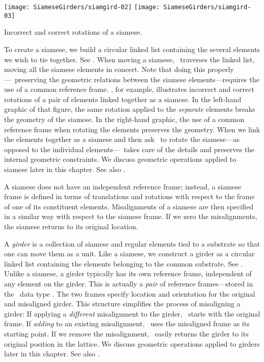 \begin{MarginFigure}
  \texttt{[image: SiameseGirders/siamgird-02]}\quad
  \texttt{[image: SiameseGirders/siamgird-03]}
  \caption{Incorrect and correct rotations of a siamese.}
  \label{fig:siamese.rot}
\end{MarginFigure}

To create a siamese, we build a circular linked list containing
the several elements we wish to tie together. See .
When moving a siamese, \PTC\ traverses the linked list, moving
all the siamese elements in concert. Note that doing this
properly---\ie\ preserving the geometric relations between the
siamese elements---requires the use of a common reference frame.
, for example, illustrates incorrect and correct rotations of a pair of elements linked together as a siamese.
In the left-hand graphic of that figure, the same rotation applied
to the \emph{separate} elements breaks the geometry of the siamese.
In the right-hand graphic, the use of a common reference frame when
rotating the elements preserves the geometry. When we link the
elements together as a siamese and then ask \PTC\ to rotate the
siamese---as opposed to the individual elements---\PTC\ takes care
of the details and preserves the internal geometric constraints.
We discuss geometric operations applied to siamese later in this
chapter. See also .

A siamese does not have an independent reference frame; instead, a
siamese frame is defined in terms of translations and rotations with
respect to the frame of one of its constituent elements. Misalignments
of a siamese are then specified in a similar way with respect to the
siamese frame. If we zero the misalignments, the siamese returns to
its original location.

%
A \emph{girder} is a collection of siamese and regular elements
tied to a substrate so that one can move them as a unit. Like a
siamese, we construct a girder as a circular linked list containing
the elements belonging to the common substrate. See .
Unlike a siamese, a girder typically has its own reference frame,
independent of any element on the girder. This is actually a
\emph{pair} of reference frames---stored in the \PTC\ data type
. The two frames specify location and
orientation for the original and misaligned girder. This structure
simplifies the process of misaligning a girder: If applying a
\emph{different} misalignment to the girder, \PTC\ starts with
the original frame. If \emph{adding} to an existing misalignment,
\PTC\ uses the misaligned frame as its starting point. If we remove
the misalignment, \PTC\ easily returns the girder to its original
position in the lattice. We discuss geometric operations applied
to girders later in this chapter. See also .

